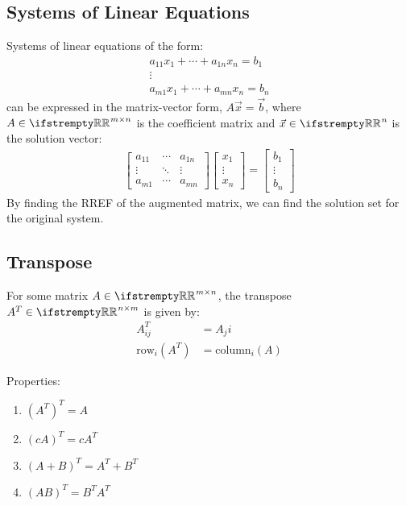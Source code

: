 \documentclass[12pt, a4paper]{article}
\begin{document}
\begin{multicols*}{3}
\subsection{Systems of Linear Equations}
Systems of linear equations of the form:
\begin{gather*}
  a_{11}x_1 + \cdots + a_{1n}x_n = b_1 \\
  \vdots \\
  a_{m1}x_1 + \cdots + a_{mn}x_n = b_n
\end{gather*}
can be expressed in the matrix-vector form, $A\vec{x} = \vec{b}$, where $A \in \RR^{m{\times}n}$ is the coefficient matrix and $\vec{x} \in \RR^n$ is the solution vector:
\begin{gather*}
  \begin{bmatrix}a_{11} & \cdots & a_{1n} \\ \vdots & \ddots & \vdots \\ a_{m1} & \cdots & a_{mn}\end{bmatrix}\begin{bmatrix}x_1 \\ \vdots \\ x_n \end{bmatrix} = \begin{bmatrix}b_1 \\ \vdots \\ b_n \end{bmatrix}
\end{gather*}
By finding the RREF of the augmented matrix, we can find the solution set for the original system.

\subsection{Transpose}
For some matrix $A \in \RR^{m{\times}n}$, the transpose $A^T \in \RR^{n{\times}m}$ is given by:
\begin{align*}
  A^T_{ij} &= A_ji \\
  \text{row}_i(A^T) &= \text{column}_i(A)
\end{align*}

Properties:
\begin{enumerate}[\roman*.]
  \item $(A^T)^T = A$
  \item $(cA)^T = cA^T$
  \item $(A + B)^T = A^T + B^T$
  \item $(AB)^T = B^TA^T$
\end{enumerate}


\end{multicols*}
\end{document}
